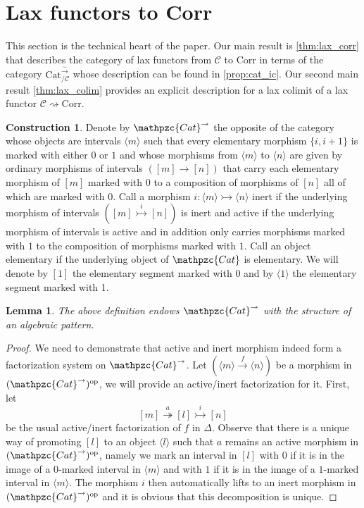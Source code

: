 \documentclass[a4paper, reqno]{amsart}
\newtheorem{lemma}[theorem]{Lemma}
\theoremstyle{definition}
\newtheorem{construction}[theorem]{Construction}
\newcommand\cC{\mathscr C}
\newcommand\op{\mathrm{op}}
\newcommand\cat{\mathrm{Cat}}
\newcommand\ccat{\mathpzc{Cat}}
\newcommand\corr{\mathrm{Corr}}
\newcommand\wrr{{\overset{\sim}{\rightarrow}}}
\begin{document}
\section{Lax functors to Corr}\label{sect:five}
This section is the technical heart of the paper. Our main result is \cref{thm:lax_corr} that describes the category of lax functors from $\cC$ to $\corr$ in terms of the category $\cat^\wrr_{/\cC}$ whose description can be found in \cref{prop:cat_ic}. Our second main result \cref{thm:lax_colim} provides an explicit description for a lax colimit of a lax functor $\cC\rightsquigarrow\corr$. 
\begin{construction}
Denote by $\ccat^\rightarrow$ the opposite of the category whose objects are intervals $\langle m\rangle$ such that every elementary morphism $\{i,i+1\}$ is marked with either $0$ or $1$ and whose morphisms from $\langle m\rangle$ to $\langle n \rangle$ are given by ordinary morphisms of intervals $([m]\rightarrow[n])$ that carry each elementary morphism of $[m]$ marked with $0$ to a composition of morphisms of $[n]$ all of which are marked with $0$. Call a morphism $i:\langle m\rangle\rightarrowtail \langle n \rangle$ inert if the underlying morphism of intervals $([m]\overset{i}{\rightarrowtail}[n])$ is inert and active if the underlying morphism of intervals is active and in addition only carries morphisms marked with $1$ to the composition of morphisms marked with $1$. Call an object elementary if the underlying object of $\ccat$ is elementary. We will denote by $[1]$ the elementary segment marked with $0$ and by $\langle1\rangle$ the elementary segment marked with 1.
\end{construction}
\begin{lemma}
The above definition endows $\ccat^\rightarrow$ with the structure of an algebraic pattern.
\end{lemma}
\begin{proof}
We need to demonstrate that active and inert morphism indeed form a factorization system on $\ccat^\rightarrow$. Let $(\langle m \rangle\xrightarrow{f}\langle n\rangle)$ be a morphism in $(\ccat^\rightarrow)^\op$, we will provide an active/inert factorization for it. First, let 
\[[m]\overset{a}{\twoheadrightarrow}[l]\overset{i}{\rightarrowtail}[n]\]
be the usual active/inert factorization of $f$ in $\Delta$. Observe that there is a unique way of promoting $[l]$ to an object $\langle l\rangle$ such that $a$ remains an active morphism in $(\ccat^\rightarrow)^\op$, namely we mark an interval in $[l]$ with $0$ if it is in the image of a $0$-marked interval in $\langle m\rangle$ and with $1$ if it is in the image of a $1$-marked interval in $\langle m \rangle$. The morphism $i$ then automatically lifts to an inert morphism in $(\ccat^\rightarrow)^\op$ and it is obvious that this decomposition is unique.
\end{proof}
\end{document}
